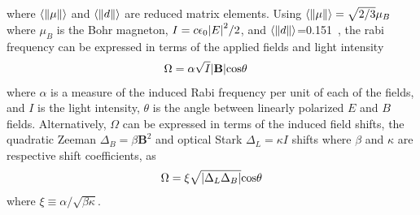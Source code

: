 	where $\langle\norm{\mu}\rangle$ and $\langle\norm{d}\rangle$ are reduced matrix elements. Using $\langle\norm{\mu}\rangle=\sqrt{2/3}\mu_{B}$ where $\mu_{B}$ is the Bohr magneton, $I=c\epsilon_{0}\abs{E}^{2}/2$, and $\langle\norm{d}\rangle$=0.151~\cite{cooper18}, the rabi frequency can be expressed in terms of the applied fields and light intensity
	\begin{align}
		\Omega&=\alpha\sqrt{I}\abs{\textbf{B}}\text{cos}\theta
	\end{align}
	\noindent where $\alpha$ is a measure of the induced Rabi frequency per unit of each of the fields, and $I$ is the light intensity, $\theta$ is the angle between linearly polarized $E$ and $B$ fields. Alternatively, $\Omega$ can be expressed in terms of the induced field shifts, the quadratic Zeeman $\Delta_B=\beta \textbf{B}^{2}$ and optical Stark $\Delta_L=\kappa I$ shifts where $\beta$ and $\kappa$ are respective shift coefficients, as 
	\begin{align}
		\Omega=\xi\sqrt{\abs{\Delta_L \Delta_B}}\text{cos}\theta
	\end{align}
	where $\xi\equiv\alpha/\sqrt{\beta\kappa}$. 

	




